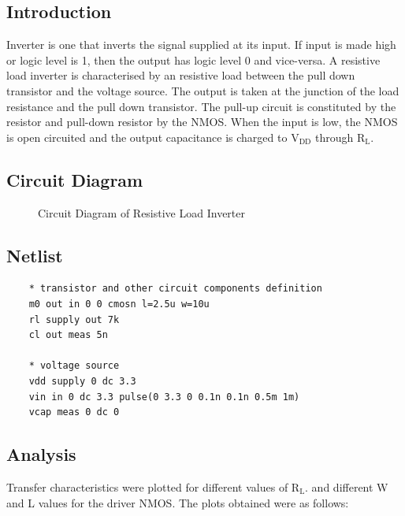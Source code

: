 \documentclass[12pt]{article}
\begin{document}
	\subsection{Introduction}
	Inverter is one that inverts the signal supplied at its input. If input is made high or logic level is 1, then the output has logic level 0 and vice-versa. A resistive load inverter is characterised by an resistive load between the pull down transistor and the voltage source. The output is taken at the junction of the load resistance and the pull down transistor. The pull-up circuit is constituted by the resistor and pull-down resistor by the NMOS. When the input is low, the NMOS is open circuited and the output capacitance is charged to $\text{V}_\text{DD}$ through $\text{R}_\text{L}$.
	
	\subsection{Circuit Diagram}
	\begin{figure}[H]
		\begin{center}
			
			\caption{Circuit Diagram of Resistive Load Inverter}
			\label{fig::resloadckt}
		\end{center}
	\end{figure}
	
	\subsection{Netlist}
	\begin{lstlisting}
	* transistor and other circuit components definition
	m0 out in 0 0 cmosn l=2.5u w=10u
	rl supply out 7k
	cl out meas 5n
	
	* voltage source
	vdd supply 0 dc 3.3
	vin in 0 dc 3.3 pulse(0 3.3 0 0.1n 0.1n 0.5m 1m)
	vcap meas 0 dc 0
	\end{lstlisting}
	
	\subsection{Analysis}
	
	Transfer characteristics were plotted for different values of $\text{R}_\text{L}$. and different W and L values for the driver NMOS. The plots obtained were as follows:
	
\end{document}
